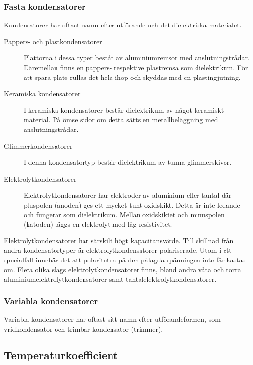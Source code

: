 \subsubsection{Fasta kondensatorer}


Kondensatorer har oftast namn efter utförande och det dielektriska materialet.
\begin{description}
\item[Pappers- och plastkondensatorer]
Plattorna i dessa typer består av aluminiumremsor med anslutningstrådar.
Däremellan finns en pap\-pe\-rs- re\-spe\-k\-ti\-ve plastremsa som dielektrikum.
För att spara plats rullas det hela ihop och skyddas med en plastingjutning.

\item[Keramiska kondensatorer]
I keramiska kondensatorer består dielektrikum av något keramiskt material.
På ömse sidor om detta sätts en metallbeläggning med anslutningstrådar.

\item[Glimmerkondensatorer]
I denna kondensatortyp består dielektrikum av tunna glimmerskivor.

\item[Elektrolytkondensatorer]
Elektrolytkondensatorer har elektroder av aluminium eller tantal där pluspolen
(anoden) ges ett mycket tunt oxidskikt.
Detta är inte ledande och fungerar som dielektrikum.
Mellan oxidskiktet och minuspolen (katoden) läggs en elektrolyt med låg
resistivitet.
\end{description}

\noindent
Elektrolytkondensatorer har särskilt högt kapacitansvärde.
Till skillnad från andra kondensatortyper är elektrolytkondensatorer
polariserade.
Utom i ett specialfall innebär det att polariteten på den pålagda spänningen
inte får kastas om.
Flera olika slags elektrolytkondensatorer finns, bland andra våta och torra
aluminiumelektrolytkondensatorer samt tantalelektrolytkondensatorer.

\subsubsection{Variabla kondensatorer}
Variabla kondensatorer har oftast sitt namn efter utförandeformen, som
vridkondensator och trimbar kondensator (trimmer).

\subsection{Temperaturkoefficient}


